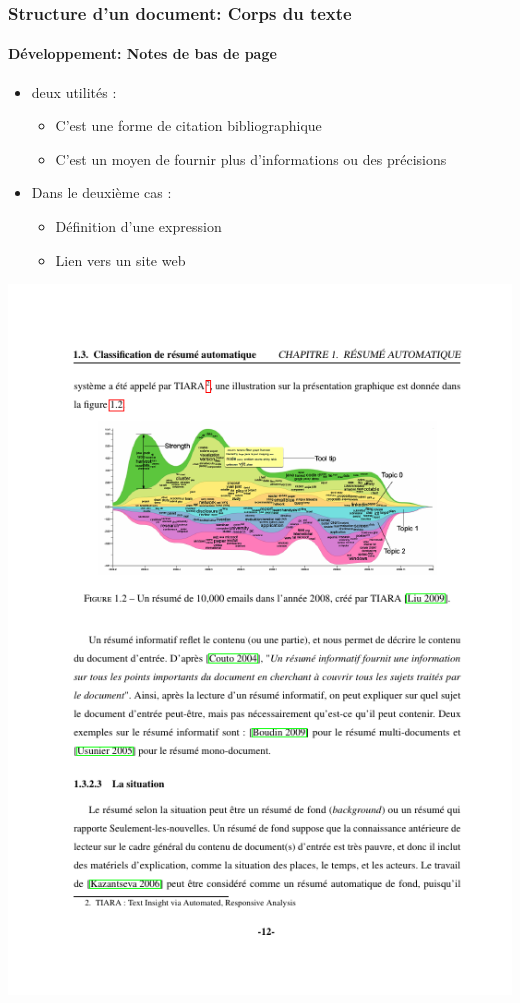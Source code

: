 \documentclass[xcolor=table]{beamer}
\begin{document}
\begin{frame}
\frametitle{Structure d'un document: Corps du texte}
\framesubtitle{Développement: Notes de bas de page}

\begin{minipage}{0.52\textwidth}
	\begin{itemize}
		\item deux utilités :
		
		\begin{itemize}
			\item C'est une forme de citation bibliographique
			\item C'est un moyen de fournir plus d'informations ou des précisions
		\end{itemize}
	
		\item Dans le deuxième cas : 
		
		\begin{itemize}
			\item Définition d'une expression
			\item Lien vers un site web
		\end{itemize}
	\end{itemize}
\end{minipage}
\begin{minipage}{0.42\textwidth}
	\includegraphics[width=\textwidth]{..//img/Bweb03-redaction/dev.png}
\end{minipage}

\end{frame}
\end{document}

